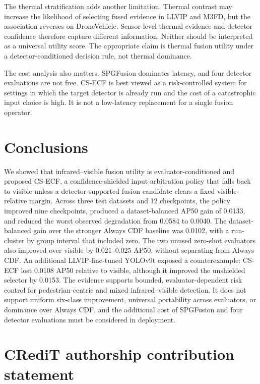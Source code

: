 \documentclass[preprint,11pt]{elsarticle}
\begin{document}
The thermal stratification adds another limitation. Thermal contrast may
increase the likelihood of selecting fused evidence in LLVIP and M3FD, but the
association reverses on DroneVehicle. Sensor-level thermal evidence and
detector confidence therefore capture different information. Neither should be
interpreted as a universal utility score. The appropriate claim is thermal
fusion utility under a detector-conditioned decision rule, not thermal dominance.

The cost analysis also matters. SPGFusion dominates latency, and four detector
evaluations are not free. CS-ECF is best viewed as a risk-controlled system for
settings in which the target detector is already run and the cost of a
catastrophic input choice is high. It is not a low-latency replacement for a
single fusion operator.

\section{Conclusions}

We showed that infrared--visible fusion utility is evaluator-conditioned and
proposed CS-ECF, a confidence-shielded input-arbitration policy that falls back
to visible unless a detector-supported fusion candidate clears a fixed
visible-relative margin. Across three test datasets and 12 checkpoints, the
policy improved nine checkpoints, produced a dataset-balanced AP50 gain of
0.0133, and reduced the worst observed degradation from 0.0584 to 0.0040. The
dataset-balanced gain over the stronger Always CDF baseline was 0.0102, with a
run-cluster by group interval that included zero. The
two unused zero-shot evaluators also improved over visible by 0.021--0.025 AP50,
without separating from Always CDF. An additional LLVIP-fine-tuned YOLOv9t
exposed a counterexample: CS-ECF lost 0.0108 AP50 relative to visible, although
it improved the unshielded selector by 0.0153. The evidence supports bounded,
evaluator-dependent risk control for pedestrian-centric and mixed
infrared--visible detection. It does not support uniform six-class improvement,
universal portability across evaluators, or dominance over Always CDF, and the
additional cost of SPGFusion and four detector evaluations must be considered
in deployment.

\section*{CRediT authorship contribution statement}
\end{document}
